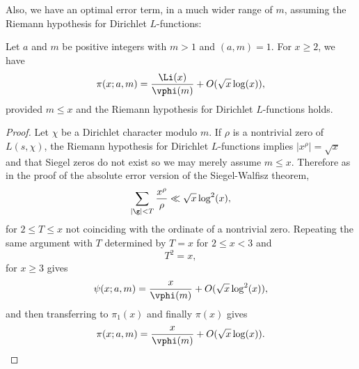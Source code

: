     Also, we have an optimal error term, in a much wider range of $m$, assuming the Riemann hypothesis for Dirichlet $L$-functions:
    
    \begin{proposition}
      Let $a$ and $m$ be positive integers with $m > 1$ and $(a,m) = 1$. For $x \ge 2$, we have
      \[
        \pi(x;a,m) = \frac{\Li(x)}{\vphi(m)}+O(\sqrt{x}\log(x)),
      \]
      provided $m \le x$ and the Riemann hypothesis for Dirichlet $L$-functions holds.
    \end{proposition}
    \begin{proof}
      Let $\chi$ be a Dirichlet character modulo $m$. If $\rho$ is a nontrivial zero of $L(s,\chi)$, the Riemann hypothesis for Dirichlet $L$-functions implies $|x^{\rho}| = \sqrt{x}$ and that Siegel zeros do not exist so we may merely assume $m \le x$. Therefore as in the proof of the absolute error version of the Siegel-Walfisz theorem,
      \[
        \sum_{|\g| < T}\frac{x^{\rho}}{\rho} \ll \sqrt{x}\log^{2}(x),
      \]
      for $2 \le T \le x$ not coinciding with the ordinate of a nontrivial zero. Repeating the same argument with $T$ determined by $T = x$ for $2 \le x < 3$ and 
      \[
        T^{2} = x,
      \]
      for $x \ge 3$ gives
      \[
        \psi(x;a,m) = \frac{x}{\vphi(m)}+O(\sqrt{x}\log^{2}(x)),
      \]
      and then transferring to $\pi_{1}(x)$ and finally $\pi(x)$ gives
      \[
        \pi(x;a,m) = \frac{x}{\vphi(m)}+O(\sqrt{x}\log(x)).
      \]
      \end{proof}
